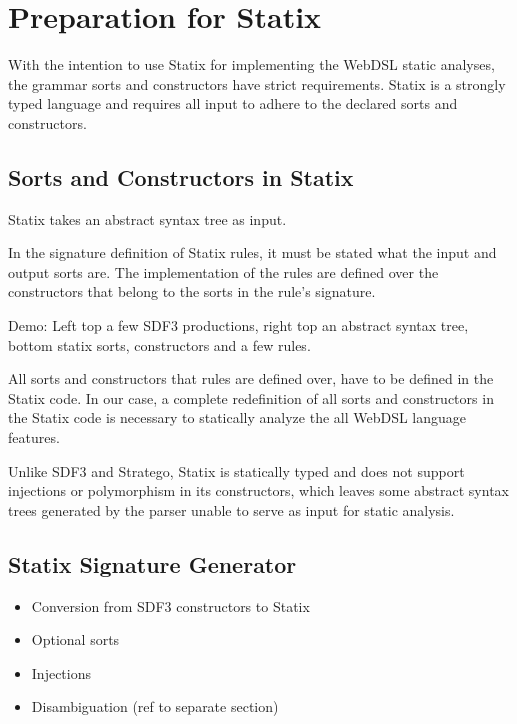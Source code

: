   \section{Preparation for Statix}

    With the intention to use Statix for implementing the WebDSL static analyses, the grammar sorts and constructors have strict requirements. Statix is a strongly typed language and requires all input to adhere to the declared sorts and constructors.

    \subsection{Sorts and Constructors in Statix}

      Statix takes an abstract syntax tree as input.

      In the signature definition of Statix rules, it must be stated what the input and output sorts are. The implementation of the rules are defined over the constructors that belong to the sorts in the rule's signature.

      Demo: Left top a few SDF3 productions, right top an abstract syntax tree, bottom statix sorts, constructors and a few rules.

      All sorts and constructors that rules are defined over, have to be defined in the Statix code. In our case, a complete redefinition of all sorts and constructors in the Statix code is necessary to statically analyze the all WebDSL language features.

      Unlike SDF3 and Stratego, Statix is statically typed and does not support injections or polymorphism in its constructors, which leaves some abstract syntax trees generated by the parser unable to serve as input for static analysis.

    \subsection{Statix Signature Generator}

      \begin{itemize}
        \item Conversion from SDF3 constructors to Statix
        \item Optional sorts
        \item Injections
        \item Disambiguation (ref to separate section)
      \end{itemize}

